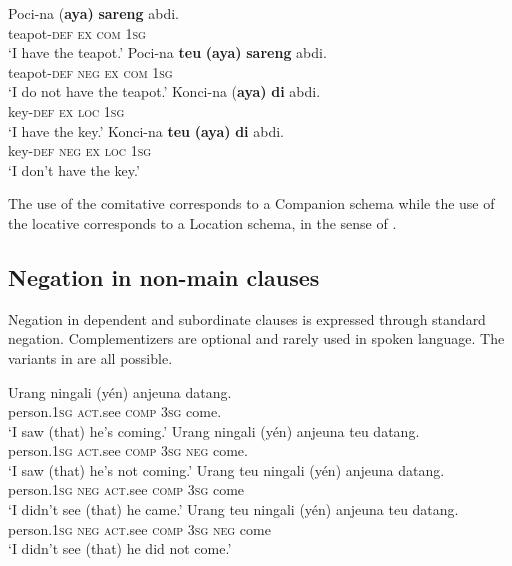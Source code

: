 \documentclass[output=paper]{langscibook}
\begin{document}
 \ea\label{ex:sun:26}
    \ea\label{ex:sun:26a}
        \gll  Poci-na (\textbf{aya)} \textbf{sareng} abdi.\\ 
              teapot-\textsc{def} \textsc{ex} \textsc{com} 1\textsc{sg}\\
        \glt ‘I have the teapot.’
    \ex\label{ex:sun:26b}
        \gll  Poci-na \textbf{teu} \textbf{(aya)} \textbf{sareng} abdi.\\
              teapot-\textsc{def} \textsc{neg} \textsc{ex} \textsc{com} 1\textsc{sg}\\
        \glt ‘I do not have the teapot.’
    \ex\label{ex:sun:26c}
        \gll  Konci-na (\textbf{aya)} \textbf{di} abdi.\\
              key-\textsc{def} \textsc{ex} \textsc{loc} 1\textsc{sg}\\
        \glt ‘I have the key.’
    \ex\label{ex:sun:26d}
        \gll  Konci-na \textbf{teu} \textbf{(aya)} \textbf{di} abdi.\\
              key-\textsc{def} \textsc{neg} \textsc{ex} \textsc{loc} 1\textsc{sg}\\
        \glt ‘I don’t have the key.’
    \z
\z 

The use of the comitative corresponds to a Companion schema while the use of the locative corresponds to a Location schema, in the sense of \citet{Heine1997}.

\subsection{Negation in non-main clauses}\label{sec:sun:2.4}

Negation in dependent and subordinate clauses is expressed through standard negation. Complementizers are optional and rarely used in spoken language. The variants in  are all possible. 

\ea\label{ex:sun:27}
    \ea\label{ex:sun:27a}
        \gll  Urang ningali (yén) anjeuna datang. \\ 
              person.1\textsc{sg} \textsc{act}.see \textsc{comp} 3\textsc{sg} come.\\
        \glt ‘I saw (that) he’s coming.’ 
    \ex\label{ex:sun:27b}
        \gll  Urang ningali (yén) anjeuna teu datang. \\
              person.1\textsc{sg} \textsc{act}.see \textsc{comp} 3\textsc{sg} \textsc{neg} come.\\
        \glt ‘I saw (that) he’s not coming.’ 
    \ex\label{ex:sun:27c}
        \gll  Urang teu ningali (yén) anjeuna datang. \\
              person.1\textsc{sg} \textsc{neg} \textsc{act}.see \textsc{comp} 3\textsc{sg} come\\
        \glt ‘I didn’t see (that) he came.’
    \ex\label{ex:sun:27d}
        \gll  Urang teu ningali (yén) anjeuna teu datang. \\
              person.1\textsc{sg} \textsc{neg} \textsc{act}.see \textsc{comp} 3\textsc{sg} \textsc{neg} come \\
        \glt ‘I didn’t see (that) he did not come.’
    \z
\z 
\end{document}
